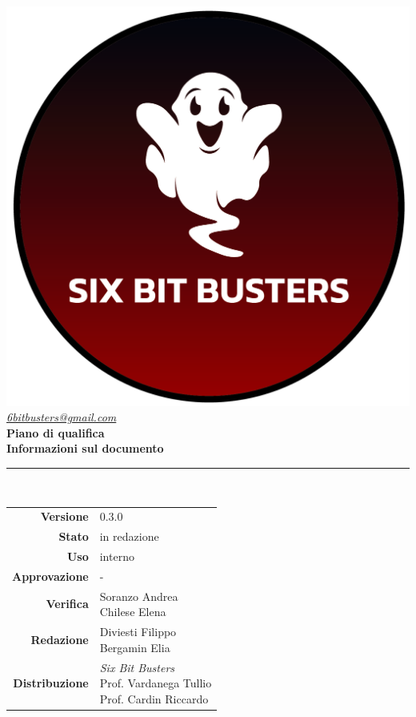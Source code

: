 \thispagestyle{empty}
\renewcommand{\arraystretch}{1.3}


\begin{titlepage}
	\begin{center}
		
	\includegraphics[scale = 0.7]{template/images/logo-circle.png}
	\\[1cm]
	\href{mailto:6bitbusters@gmail.com}		      	
	{\large{\textit{6bitbusters@gmail.com} } }\\[1cm]
	
	\Huge \textbf{Piano di qualifica} \\[1cm]

	\large \textbf{Informazioni sul documento} \\
	\rule{0.6\textwidth}{0.4pt}
	\\[0.5cm]
	\begin{tabular}{r|l}
		\textbf{Versione} & 0.3.0\\
		\textbf{Stato} & in redazione\\
		\textbf{Uso} & interno\\                         
		\textbf{Approvazione} & -\\                      
		\textbf{Verifica} & \parbox[t]{5cm}{Soranzo Andrea\\Chilese Elena}\\                         
		\textbf{Redazione} & \parbox[t]{5cm}{Diviesti Filippo \\ Bergamin Elia}\\
		\textbf{Distribuzione} & \parbox[t]{5cm}{ \textit{Six Bit Busters} \\ Prof. Vardanega Tullio 
	 \\ Prof. Cardin Riccardo}
	\end{tabular}	
	\\[1.2cm]


\end{center}
\end{titlepage}
